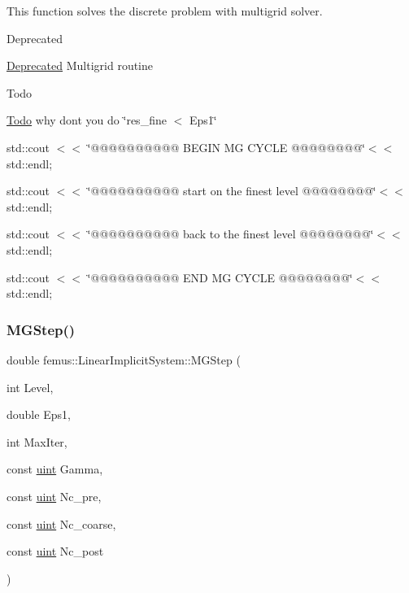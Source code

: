 This function solves the discrete problem with multigrid solver. 

\begin{DoxyRefDesc}{Deprecated}
\item[\mbox{\hyperlink{deprecated__deprecated000012}{Deprecated}}]Multigrid routine \end{DoxyRefDesc}


\begin{DoxyRefDesc}{Todo}
\item[\mbox{\hyperlink{todo__todo000002}{Todo}}]why dont you do \char`\"{}res\+\_\+fine $<$ Eps1\char`\"{} \end{DoxyRefDesc}
std\+::cout $<$$<$ \char`\"{}@@@@@@@@@@ B\+E\+G\+I\+N M\+G C\+Y\+C\+L\+E @@@@@@@@\char`\"{}$<$$<$ std\+::endl;

std\+::cout $<$$<$ \char`\"{}@@@@@@@@@@ start on the finest level @@@@@@@@\char`\"{}$<$$<$ std\+::endl;

std\+::cout $<$$<$ \char`\"{}@@@@@@@@@@ back to the finest level @@@@@@@@\char`\"{}$<$$<$ std\+::endl;

std\+::cout $<$$<$ \char`\"{}@@@@@@@@@@ E\+N\+D M\+G C\+Y\+C\+L\+E @@@@@@@@\char`\"{}$<$$<$ std\+::endl; \mbox{\label{classfemus_1_1_linear_implicit_system_a7b835a4f2bd6340c0e76124b017db52a}} 
\subsubsection{\texorpdfstring{M\+G\+Step()}{MGStep()}}
{\footnotesize\ttfamily double femus\+::\+Linear\+Implicit\+System\+::\+M\+G\+Step (\begin{DoxyParamCaption}\item[{int}]{Level,  }\item[{double}]{Eps1,  }\item[{int}]{Max\+Iter,  }\item[{const \mbox{\hyperlink{_typedefs_8hpp_a91ad9478d81a7aaf2593e8d9c3d06a14}{uint}}}]{Gamma,  }\item[{const \mbox{\hyperlink{_typedefs_8hpp_a91ad9478d81a7aaf2593e8d9c3d06a14}{uint}}}]{Nc\+\_\+pre,  }\item[{const \mbox{\hyperlink{_typedefs_8hpp_a91ad9478d81a7aaf2593e8d9c3d06a14}{uint}}}]{Nc\+\_\+coarse,  }\item[{const \mbox{\hyperlink{_typedefs_8hpp_a91ad9478d81a7aaf2593e8d9c3d06a14}{uint}}}]{Nc\+\_\+post }\end{DoxyParamCaption})}



